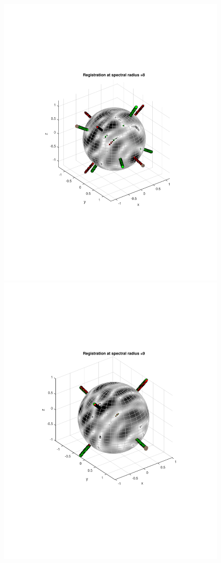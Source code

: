 \documentclass{UCF_ETD}
\begin{document}
\begin{figure}[H]
\begin{center}
\includegraphics[scale=0.32]{RobustRegistration/NoisyTransReg_8}
\includegraphics[scale=0.32]{RobustRegistration/NoisyTransReg_9}

\end{center}
\end{figure}
\end{document}
